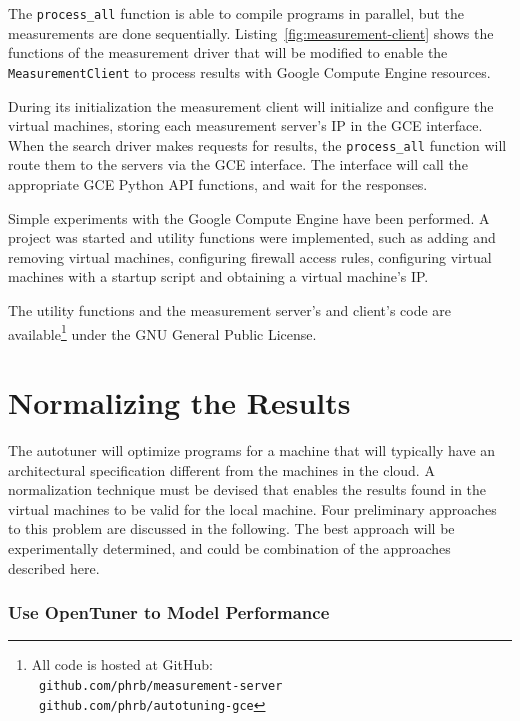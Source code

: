 \documentclass[a4paper, 12pt]{article}
\begin{document}


The \texttt{\footnotesize process\_all} function is able to compile programs in
parallel, but the measurements are done sequentially.
Listing~\ref{fig:measurement-client} shows the functions of the measurement
driver that will be modified to enable the \texttt{\footnotesize
MeasurementClient} to process results with Google Compute Engine resources.

During its initialization the measurement client will initialize and configure
the virtual machines, storing each measurement server's IP in the GCE
interface.  When the search driver makes requests for results, the
\texttt{\footnotesize process\_all} function will route them to the
servers via the GCE interface.  The interface will call the appropriate GCE
Python API functions, and wait for the responses.

Simple experiments with the Google Compute Engine have been performed. A
project was started and utility functions were implemented, such as
adding and removing virtual machines, configuring firewall access
rules, configuring virtual machines with a startup script and obtaining a
virtual machine's IP.

The utility functions and the measurement server's and client's code are
available\footnote{All code is hosted at GitHub: \\ \texttt{\scriptsize
github.com/phrb/measurement-server} \\ \texttt{\scriptsize
github.com/phrb/autotuning-gce}} under the GNU General Public License.

\section{Normalizing the Results}
\label{sec:norm}

The autotuner will optimize programs for a machine that will typically have an
architectural specification different from the machines in the cloud. A
normalization technique must be devised that enables the results found in the
virtual machines to be valid for the local machine.  Four preliminary
approaches to this problem are discussed in the following. The best approach
will be experimentally determined, and could be combination of the approaches
described here.

\subsubsection{Use OpenTuner to Model Performance}
\end{document}
